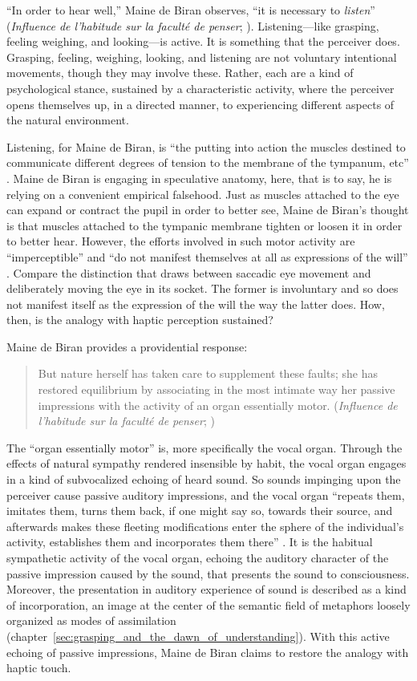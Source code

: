 ``In order to hear well,'' Maine de Biran observes, ``it is necessary to \emph{listen}'' (\emph{Influence de l'habitude sur la faculté de penser}; \citealt[63--4]{Boehm:1929aa}). Listening---like grasping, feeling weighing, and looking---is active. It is something that the perceiver does. Grasping, feeling, weighing, looking, and listening are not voluntary intentional movements, though they may involve these. Rather, each are a kind of psychological stance, sustained by a characteristic activity, where the perceiver opens themselves up, in a directed manner, to experiencing different aspects of the natural environment.

Listening, for Maine de Biran, is ``the putting into action the muscles destined to communicate different degrees of tension to the membrane of the tympanum, etc'' \citep[64]{Boehm:1929aa}. Maine de Biran is engaging in speculative anatomy, here, that is to say, he is relying on a convenient empirical falsehood. Just as muscles attached to the eye can expand or contract the pupil in order to better see, Maine de Biran's thought is that muscles attached to the tympanic membrane tighten or loosen it in order to better hear. However, the efforts involved in such motor activity are ``imperceptible'' and ``do not manifest themselves at all as expressions of the will'' \citep[64]{Boehm:1929aa}. Compare the distinction that \citet[]{Smith:2002sa} draws between saccadic eye movement and deliberately moving the eye in its socket. The former is involuntary and so does not manifest itself as the expression of the will the way the latter does. How, then, is the analogy with haptic perception sustained? 

Maine de Biran provides a providential response:
\begin{quote}
	But nature herself has taken care to supplement these faults; she has restored equilibrium by associating in the most intimate way her passive impressions with the activity of an organ essentially motor. (\emph{Influence de l'habitude sur la faculté de penser}; \citealt[63--4]{Boehm:1929aa})
\end{quote}
The ``organ essentially motor'' is, more specifically the vocal organ. Through the effects of natural sympathy rendered insensible by habit, the vocal organ engages in a kind of subvocalized echoing of heard sound. So sounds impinging upon the perceiver cause passive auditory impressions, and the vocal organ ``repeats them, imitates them, turns them back, if one might say so, towards their source, and afterwards makes these fleeting modifications enter the sphere of the individual's activity, establishes them and incorporates them there'' \citep[64]{Boehm:1929aa}. It is the habitual sympathetic activity of the vocal organ, echoing the auditory character of the passive impression caused by the sound, that presents the sound to consciousness. Moreover, the presentation in auditory experience of sound is described as a kind of incorporation, an image at the center of the semantic field of metaphors loosely organized as modes of assimilation (chapter~\ref{sec:grasping_and_the_dawn_of_understanding}). With this active echoing of passive impressions, Maine de Biran claims to restore the analogy with haptic touch.

